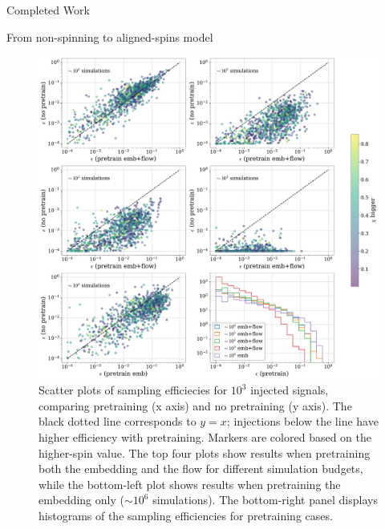 \documentclass[a4paper, 12pt, twoside, openright, titlepage]{book}
\begin{document}
\begin{chapter}{Completed Work}
\begin{section}{From non-spinning to aligned-spins model}
\begin{figure}
\includegraphics[width=1.1\columnwidth]{figures/neff.pdf}
\caption{Scatter plots of sampling efficiecies  for $10^{3}$ injected signals, comparing pretraining (x axis) and no pretraining (y axis). The black dotted line corresponds to $y=x$; injections below the line have higher efficiency with pretraining. Markers are colored based on the higher-spin value. The top four plots show results when pretraining both the embedding and the flow for different simulation budgets, while the bottom-left plot shows results when pretraining the embedding only ($\sim 10^{6}$ simulations). The bottom-right panel displays histograms of the sampling efficiencies for pretraining cases.}
\label{eff}
\end{figure}







\end{section}



\end{chapter}
\end{document}
